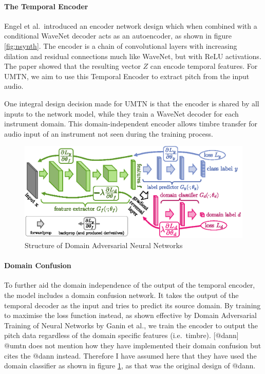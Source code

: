 \documentclass[]{article}
\begin{document}
\hypertarget{the-temporal-encoder}{%
\paragraph{The Temporal Encoder}\label{the-temporal-encoder}}

Engel et al.~introduced an encoder network design which when combined
with a conditional WaveNet decoder acts as an autoencoder, as shown in
figure \ref{fig:nsynth}. The encoder is a chain of convolutional layers
with increasing dilation and residual connections much like WaveNet, but
with ReLU activations. The paper showed that the resulting vector \(Z\)
can encode temporal features. For UMTN, we aim to use this Temporal
Encoder to extract pitch from the input audio.

One integral design decision made for UMTN is that the encoder is shared
by all inputs to the network model, while they train a WaveNet decoder
for each instrument domain. This domain-independent encoder allows
timbre transfer for audio input of an instrument not seen during the
training process.

\begin{figure}[h]
    \includegraphics[width=\textwidth]{figures/dann.eps}
    \centering
    \caption{Structure of Domain Adversarial Neural Networks \label{fig:dann}}
\end{figure}

\hypertarget{domain-confusion}{%
\paragraph{Domain Confusion}\label{domain-confusion}}

To further aid the domain independence of the output of the temporal
encoder, the model includes a domain confusion network. It takes the
output of the temporal decoder as the input and tries to predict its
source domain. By training to maximise the loss function instead, as
shown effective by Domain Adversarial Training of Neural Networks by
Ganin et al., we train the encoder to output the pitch data regardless
of the domain specific features (i.e.~timbre). {[}@dann{]} @umtn does
not mention how they have implemented their domain confusion but cites
the @dann instead. Therefore I have assumed here that they have used the
domain classifier as shown in figure \ref{fig:dann}, as that was the
original design of @dann.
\end{document}
